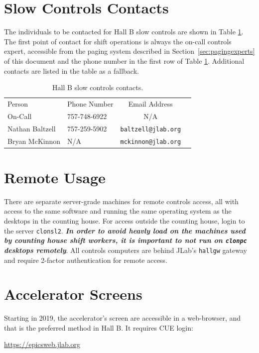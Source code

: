 \documentclass[amsmath,amssymb,notitlepage,11pt]{revtex4}
\begin{document}
\section{Slow Controls Contacts}
The individuals to be contacted for Hall B slow controls are shown in Table \ref{tab:experts}.  The first point of contact for shift operations is always the on-call controls expert, accessible from the paging system described in Section~\ref{sec:pagingexperts} of this document and the phone number in the first row of Table \ref{tab:experts}.  Additional contacts are listed in the table as a fallback.

\begin{table}[htbp]\centering
    \begin{tabular}{llcr}\toprule[1.5pt]
        Person & Phone Number & Email Address \\ \cmidrule[0.5pt]{1-3}
        On-Call & 757-748-6922 & N/A \\
        Nathan Baltzell & 757-259-5902 & \texttt{baltzell@jlab.org} \\
        Bryan McKinnon & N/A & \texttt{mckinnon@jlab.org} \\
        \bottomrule[1.5pt]
    \end{tabular}
    \caption{Hall B slow controls contacts.\label{tab:experts}}
\end{table}

\section{Remote Usage}\label{sec:remote}
There are separate server-grade machines for remote controls access, all with access to the same software and running the same operating system as the desktops in the counting house.  For access outside the counting house, login to the server \texttt{clonsl2}.  {\bf\em In order to avoid heavly load on the machines used by counting house shift workers, it is important to not run on \texttt{clonpc} desktops remotely}.  All controls computers are behind JLab's \texttt{hallgw} gateway and require 2-factor authentication for remote access.  

\section{Accelerator Screens}
Starting in 2019, the accelerator's screen are accessible in a web-browser, and that is the preferred method in Hall B.  It requires CUE login:

\begin{center}\url{https://epicsweb.jlab.org}\end{center}
\end{document}
